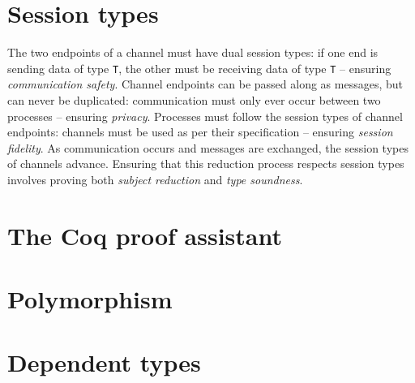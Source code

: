 \documentclass{mproj}
\begin{document}

\section{Session types}\label{session-types}


The two endpoints of a channel must have dual session types: if one end is
sending data of type \texttt{T}, the other must be receiving data of type
\texttt{T} -- ensuring \textit{communication safety}. Channel endpoints can be
passed along as messages, but can never be duplicated: communication must only
ever occur between two processes -- ensuring \textit{privacy}.  Processes must
follow the session types of channel endpoints: channels must be used as per
their specification -- ensuring \textit{session fidelity}. As communication
occurs and messages are exchanged, the session types of channels advance.
Ensuring that this reduction process respects session types involves proving
both \textit{subject reduction} and \textit{type soundness}. \cite{Dardha2016m}

\section{The Coq proof assistant}\label{coq}


\section{Polymorphism}\label{polymorphism}

\section{Dependent types}\label{dependent-types}
\end{document}
